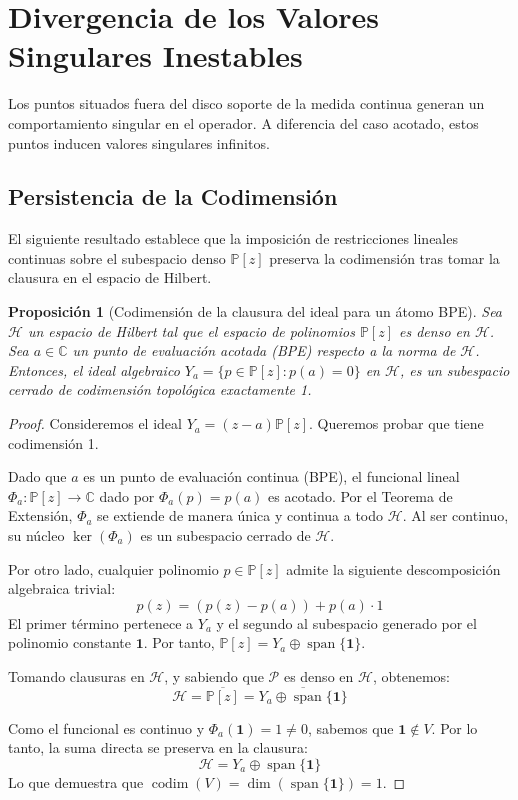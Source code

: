 \documentclass[12pt,a4paper]{article}
\newtheorem{proposicion}{Proposición}
\theoremstyle{definition}
\theoremstyle{remark}
\newcommand{\Poly}{\mathbb{P}[z]}
\begin{document}
\section{Divergencia de los Valores Singulares Inestables}

Los puntos situados fuera del disco soporte de la medida continua generan un comportamiento singular en el operador. A diferencia del caso acotado, estos puntos inducen valores singulares infinitos.

\subsection{Persistencia de la Codimensión}

El siguiente resultado establece que la imposición de restricciones lineales continuas sobre el subespacio denso $\Poly$ preserva la codimensión tras tomar la clausura en el espacio de Hilbert.


\begin{proposicion}[Codimensión de la clausura del ideal para un átomo BPE]
    Sea $\mathcal{H}$ un espacio de Hilbert tal que el espacio de polinomios $\mathbb{P}[z]$ es denso en $\mathcal{H}$. Sea $a \in \mathbb{C}$ un punto de evaluación acotada (BPE) respecto a la norma de $\mathcal{H}$. Entonces, el ideal algebraico $Y_a = \{p \in \mathbb{P}[z] : p(a) = 0\}$ en $\mathcal{H}$, es un subespacio cerrado de codimensión topológica exactamente 1.
\end{proposicion}

\begin{proof}
    Consideremos el ideal $Y_a = (z-a)\Poly$. Queremos probar que tiene codimensión 1.

    Dado que $a$ es un punto de evaluación continua (BPE), el funcional lineal $\Phi_a: \Poly \to \mathbb{C}$ dado por $\Phi_a(p) = p(a)$ es acotado. Por el Teorema de Extensión, $\Phi_a$ se extiende de manera única y continua a todo $\mathcal{H}$. Al ser continuo, su núcleo $\ker(\Phi_a)$ es un subespacio cerrado de $\mathcal{H}$.

    Por otro lado, cualquier polinomio $p \in \Poly$ admite la siguiente descomposición algebraica trivial:
    $$p(z) = (p(z) - p(a)) + p(a) \cdot 1$$
    El primer término pertenece a $Y_a$ y el segundo al subespacio generado por el polinomio constante $\mathbf{1}$. Por tanto, $\Poly = Y_a \oplus \operatorname{span}\{\mathbf{1}\}$.

    Tomando clausuras en $\mathcal{H}$, y sabiendo que $\mathcal{P}$ es denso en $\mathcal{H}$, obtenemos:
    $$\mathcal{H} = \overline{\Poly} = \overline{Y_a \oplus \operatorname{span}\{\mathbf{1}\}}$$

    Como el funcional es continuo y $\Phi_a(\mathbf{1}) = 1 \neq 0$, sabemos que $\mathbf{1} \notin V$. Por lo tanto, la suma directa se preserva en la clausura:
    $$\mathcal{H} = Y_a \oplus \operatorname{span}\{\mathbf{1}\}$$
    Lo que demuestra que $\operatorname{codim}(V) = \operatorname{dim}(\operatorname{span}\{\mathbf{1}\}) = 1$.
\end{proof}
\end{document}

